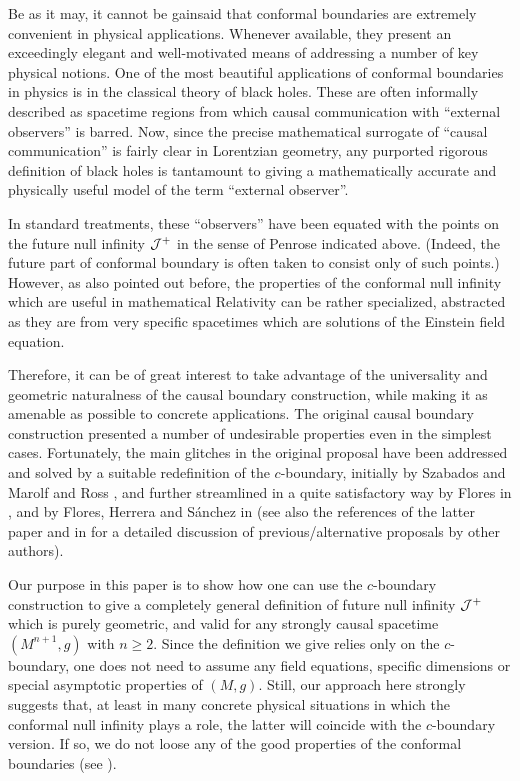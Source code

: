 Be as it may, it cannot be gainsaid that conformal boundaries are extremely convenient in physical applications. Whenever available, they present an exceedingly elegant and well-motivated means of addressing a number of key physical notions. One of the most beautiful applications of conformal boundaries in physics is in the classical theory of black holes. These are often informally described as spacetime regions from which causal communication with ``external observers'' is barred. Now, since the precise mathematical surrogate of ``causal communication'' is fairly clear in Lorentzian geometry, any purported rigorous definition of black holes is tantamount to giving a mathematically accurate and physically useful model of the term ``external observer''.

In standard treatments, these ``observers'' have been equated with the points on the future null infinity ${\cal J}^+$ in the sense of Penrose indicated above. (Indeed, the future part of conformal boundary is often taken to consist only of such points.) However, as also pointed out before, the properties of the conformal null infinity which are useful in mathematical Relativity can be rather specialized, abstracted as they are from very specific spacetimes which are solutions of the Einstein field equation.

Therefore, it can be of great interest to take advantage of the universality and geometric naturalness of the causal boundary construction, while making it as amenable as possible to concrete applications. The original causal boundary construction \cite{GerochIdealPointsSpaceTime1972} presented a number of undesirable properties even in the simplest cases. Fortunately, the main glitches in the original proposal have been addressed and solved by a suitable redefinition of the $c$-boundary, initially by Szabados \cite{SzabadosCausalboundarystrongly1988,SzabadosCausalboundarystrongly1989} and Marolf and Ross \cite{Marolfnewrecipecausal2003}, and further streamlined in a quite satisfactory way by Flores in \cite{Florescausalboundaryspacetimes2007}, and by Flores, Herrera and S\'{a}nchez in \cite{Floresfinaldefinitioncausal2011} (see also the references of the latter paper and in \cite{Garcia-ParradoCausalstructurescausal2005} for a detailed discussion of previous/alternative proposals by other authors).

Our purpose in this paper is to show how one can use the $c$-boundary construction to give a completely general definition of future null infinity ${\cal J}^+$ which is purely geometric, and valid for any strongly causal spacetime $(M^{n+1},g)$ with $n \geq 2$. Since the definition we give relies only on the $c$-boundary, one does not need to assume any field equations, specific dimensions or special asymptotic properties of $(M,g)$. %
Still, our approach here strongly suggests that, at least in many concrete physical situations in which the conformal null infinity plays a role, the latter will coincide with the $c$-boundary version. If so, we do not loose any of the good properties of the conformal boundaries (see \cite{CostaFloresHerrera2018-2}).

